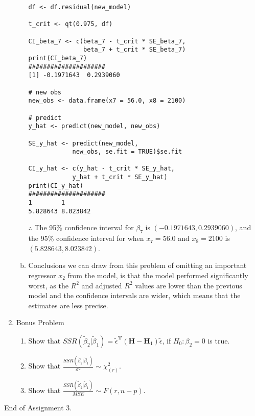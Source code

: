 \documentclass[12pt]{article}
\newcommand{\btilde}{\tilde{\beta}}
\newcommand{\etilde}{\tilde{\epsilon}}
\newcommand{\T}{\mathbf{T}}
\newcommand{\HM}{\mathbf{H}}
\begin{document}
\begin{enumerate}[1.]
\begin{enumerate}[a.]
\begin{verbatim}
df <- df.residual(new_model)

t_crit <- qt(0.975, df)

CI_beta_7 <- c(beta_7 - t_crit * SE_beta_7, 
               beta_7 + t_crit * SE_beta_7)
print(CI_beta_7)
#####################
[1] -0.1971643  0.2939060

# new obs
new_obs <- data.frame(x7 = 56.0, x8 = 2100)

# predict
y_hat <- predict(new_model, new_obs)

SE_y_hat <- predict(new_model, 
            new_obs, se.fit = TRUE)$se.fit

CI_y_hat <- c(y_hat - t_crit * SE_y_hat,
            y_hat + t_crit * SE_y_hat)
print(CI_y_hat)
#####################
1        1 
5.828643 8.023842 
                \end{verbatim}
                $\therefore$ The 95\% confidence interval for $\beta_7$ is $(-0.1971643, 0.2939060)$, 
                and the 95\% confidence interval for when $x_7 = 56.0$ and $x_8 = 2100$ is $(5.828643, 8.023842)$.
                \item Conclusions we can draw from this problem of omitting an important regressor $x_2$ from the model, is that
                the model performed significantly worst, as the $R^2$ and adjusted $R^2$ values are lower than the previous model 
                and the confidence intervals are wider, which means that the estimates are less precise.
            \end{enumerate}
            \item Bonus Problem
            \begin{enumerate}
                \item Show that $SSR(\btilde_2 | \btilde_1) =  \etilde^\T (\HM - \HM_1) \etilde$, if $H_0: \beta_2 = 0$ is true.
                \item Show that $\frac{SSR(\btilde_2 | \btilde_1)}{\sigma^2} \sim \chi^2_{(r)}$.
                \item Show that $\frac{SSR(\btilde_2 | \btilde_1)}{MSE} \sim F(r, n - p)$.
            \end{enumerate}
                
                
                 
    \end{enumerate}
End of Assignment 3.
\end{document}
